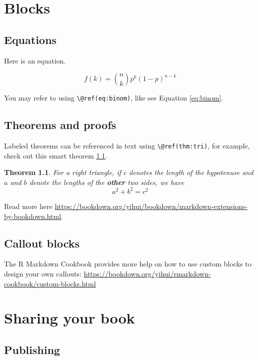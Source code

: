 \documentclass[
]{book}
\newtheorem{theorem}{Theorem}[chapter]
\theoremstyle{definition}
\theoremstyle{definition}
\theoremstyle{definition}
\theoremstyle{definition}
\theoremstyle{remark}
\begin{document}
\chapter{Blocks}\label{blocks}

\section{Equations}\label{equations}

Here is an equation.

\begin{equation}
  f\left(k\right) = \binom{n}{k} p^k\left(1-p\right)^{n-k}
  \label{eq:binom}
\end{equation}

You may refer to using \texttt{\textbackslash{}@ref(eq:binom)}, like see Equation \eqref{eq:binom}.

\section{Theorems and proofs}\label{theorems-and-proofs}

Labeled theorems can be referenced in text using \texttt{\textbackslash{}@ref(thm:tri)}, for example, check out this smart theorem \ref{thm:tri}.

\begin{theorem}
\protect\hypertarget{thm:tri}{}\label{thm:tri}For a right triangle, if \(c\) denotes the \emph{length} of the hypotenuse
and \(a\) and \(b\) denote the lengths of the \textbf{other} two sides, we have
\[a^2 + b^2 = c^2\]
\end{theorem}

Read more here \url{https://bookdown.org/yihui/bookdown/markdown-extensions-by-bookdown.html}.

\section{Callout blocks}\label{callout-blocks}

The R Markdown Cookbook provides more help on how to use custom blocks to design your own callouts: \url{https://bookdown.org/yihui/rmarkdown-cookbook/custom-blocks.html}

\chapter{Sharing your book}\label{sharing-your-book}

\section{Publishing}\label{publishing}
\end{document}
